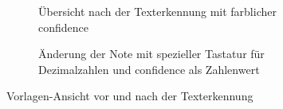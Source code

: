 \documentclass[nomenclature, oneside, 150]{HSMW-Thesis}
\begin{document}
\begin{figure}[th]
\begin{subfigure}[t]{0.3\textwidth}
        			\caption{Übersicht nach der Texterkennung mit farblicher confidence}
        			\label{fig:ocr2}
    			\end{subfigure}
    			\begin{subfigure}[t]{0.3\textwidth}
        			\caption{Änderung der Note mit spezieller Tastatur für Dezimalzahlen und confidence als Zahlenwert}
        			\label{fig:ocr3}
    			\end{subfigure}
    			\caption{Vorlagen-Ansicht vor und nach der Texterkennung}
				\label{fig:ocr}
			\end{figure}
			
\end{document}
